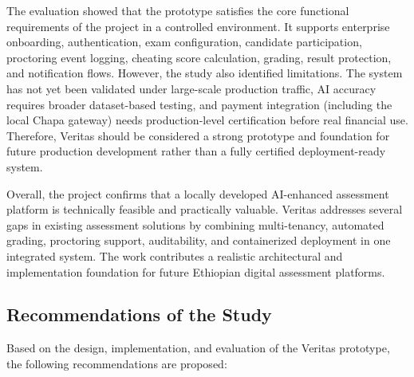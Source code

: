 The evaluation showed that the prototype satisfies the core functional requirements of the project in a controlled environment. It supports enterprise onboarding, authentication, exam configuration, candidate participation, proctoring event logging, cheating score calculation, grading, result protection, and notification flows. However, the study also identified limitations. The system has not yet been validated under large-scale production traffic, AI accuracy requires broader dataset-based testing, and payment integration (including the local Chapa gateway) needs production-level certification before real financial use. Therefore, Veritas should be considered a strong prototype and foundation for future production development rather than a fully certified deployment-ready system.

Overall, the project confirms that a locally developed AI-enhanced assessment platform is technically feasible and practically valuable. Veritas addresses several gaps in existing assessment solutions by combining multi-tenancy, automated grading, proctoring support, auditability, and containerized deployment in one integrated system. The work contributes a realistic architectural and implementation foundation for future Ethiopian digital assessment platforms.

\subsection{Recommendations of the Study}
Based on the design, implementation, and evaluation of the Veritas prototype, the following recommendations are proposed:

